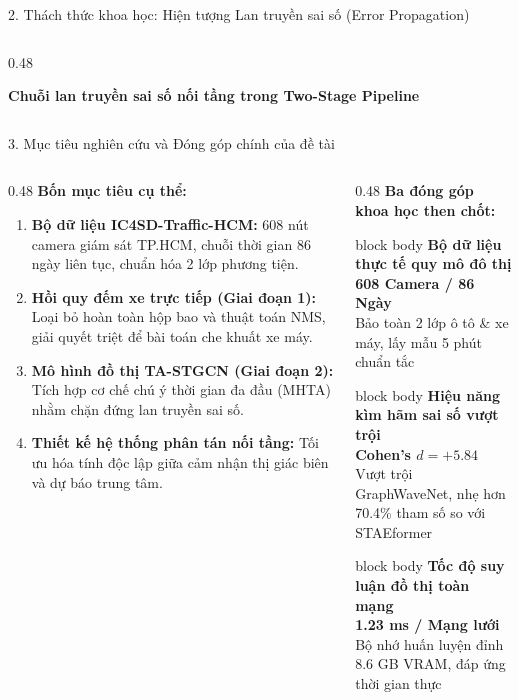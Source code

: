 \documentclass[aspectratio=169,10pt]{beamer}
\newcommand{\metricbox}[3]{
  \begin{beamercolorbox}[rounded=true,shadow=false,wd=\linewidth,sep=3pt]{block body}
    \centering
    {\footnotesize \textbf{#1}}\\[1pt]
    {\large \textbf{\textcolor{ptitred}{#2}}}\\[1pt]
    {\tiny \textcolor{black!60}{#3}}
  \end{beamercolorbox}
}
\begin{document}
\begin{frame}{2. Thách thức khoa học: Hiện tượng Lan truyền sai số (Error Propagation)}
\begin{columns}[T]
\begin{column}{0.48\textwidth}
\begin{block}{\textbf{Chuỗi lan truyền sai số nối tầng trong Two-Stage Pipeline}}
      \end{block}
    \end{column}
  \end{columns}
\end{frame}

\begin{frame}{3. Mục tiêu nghiên cứu và Đóng góp chính của đề tài}
  \begin{columns}[T]
    \begin{column}{0.48\textwidth}
      \textbf{\textcolor{ptitblue}{Bốn mục tiêu cụ thể:}}
      \begin{enumerate}
        \footnotesize
        \item \textbf{Bộ dữ liệu IC4SD-Traffic-HCM:} 608 nút camera giám sát TP.HCM, chuỗi thời gian 86 ngày liên tục, chuẩn hóa 2 lớp phương tiện.
        \item \textbf{Hồi quy đếm xe trực tiếp (Giai đoạn 1):} Loại bỏ hoàn toàn hộp bao và thuật toán NMS, giải quyết triệt để bài toán che khuất xe máy.
        \item \textbf{Mô hình đồ thị TA-STGCN (Giai đoạn 2):} Tích hợp cơ chế chú ý thời gian đa đầu (MHTA) nhằm chặn đứng lan truyền sai số.
        \item \textbf{Thiết kế hệ thống phân tán nối tầng:} Tối ưu hóa tính độc lập giữa cảm nhận thị giác biên và dự báo trung tâm.
      \end{enumerate}
    \end{column}

    \begin{column}{0.48\textwidth}
      \textbf{\textcolor{ptitred}{Ba đóng góp khoa học then chốt:}}
      \vskip 4pt
      \metricbox{Bộ dữ liệu thực tế quy mô đô thị}{608 Camera / 86 Ngày}{Bảo toàn 2 lớp ô tô \& xe máy, lấy mẫu 5 phút chuẩn tắc}
      \vskip 3pt
      \metricbox{Hiệu năng kìm hãm sai số vượt trội}{Cohen's $d = +5.84$}{Vượt trội GraphWaveNet, nhẹ hơn 70.4\% tham số so với STAEformer}
      \vskip 3pt
      \metricbox{Tốc độ suy luận đồ thị toàn mạng}{1.23 ms / Mạng lưới}{Bộ nhớ huấn luyện đỉnh 8.6 GB VRAM, đáp ứng thời gian thực}
    \end{column}
  \end{columns}
\end{frame}
\end{document}
